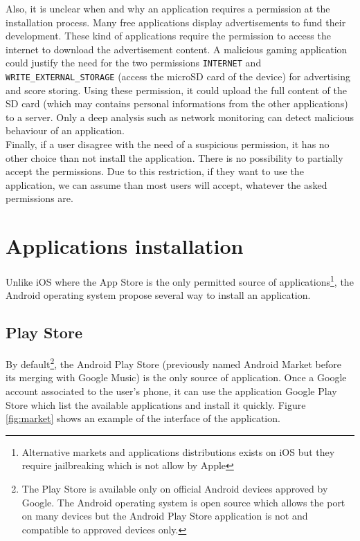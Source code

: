 Also, it is unclear when and why an application requires a permission at the installation process.
Many free applications display advertisements to fund their development.
These kind of applications require the permission to access the internet to download the advertisement content.
A malicious gaming application could justify the need for the two permissions \texttt{INTERNET} and \texttt{WRITE\_EXTERNAL\_STORAGE} (access the microSD card of the device) for advertising and score storing. Using these permission, it could upload the full content of the SD card (which may contains personal informations from the other applications) to a server.
Only a deep analysis such as network monitoring can detect malicious behaviour of an application.\\

Finally, if a user disagree with the need of a suspicious permission, it has no other choice than not install the application.
There is no possibility to partially accept the permissions.
Due to this restriction, if they want to use the application, we can assume than most users will accept, whatever the asked permissions are.

\section{Applications installation}

Unlike iOS where the App Store is the only permitted source of applications\footnote{Alternative markets and applications distributions exists on iOS but they require jailbreaking which is not allow by Apple}, the Android operating system propose several way to install an application.

\subsection{Play Store}
By default\footnote{The Play Store is available only on official Android devices approved by Google. The Android operating system is open source which allows the port on many devices but the Android Play Store application is not and compatible to approved devices only.}, the Android Play Store (previously named Android Market before its merging with Google Music) is the only source of application.
Once a Google account associated to the user's phone, it can use the application Google Play Store which list the available applications and install it quickly.
Figure \ref{fig:market} shows an example of the interface of the application.\\

